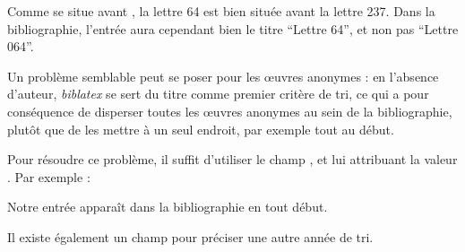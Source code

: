 Comme  se situe avant , la lettre 64 est bien située avant la lettre 237. Dans la bibliographie, l'entrée aura cependant bien le titre  \enquote{Lettre 64}, et non pas \enquote{Lettre 064}.

Un problème semblable peut se poser pour les œuvres anonymes : en l'absence d'auteur, \emph{biblatex} se sert du titre comme premier critère de tri, ce qui a pour conséquence de disperser toutes les œuvres anonymes au sein de la bibliographie, plutôt que de les mettre à un seul endroit, par exemple tout au début.

Pour résoudre ce problème, il suffit d'utiliser le champ , et lui attribuant la valeur .
Par exemple :

\begin{latexcode}
@book{clef,
    Sortname = {0},
    Title = {Œuvre anonyme}
\end{latexcode}

Notre entrée  apparaît dans la bibliographie en tout début.

Il existe également un champ  pour préciser une autre année de tri. 
